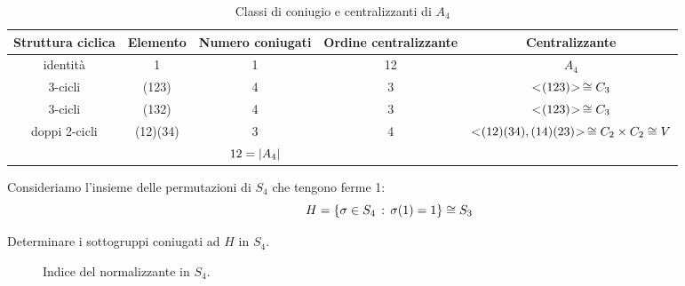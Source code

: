 \begin{sidewaystable}
	\centering
	\begin{tabular}{ccccc}
		\toprule
		Struttura ciclica & Elemento & Numero coniugati & Ordine centralizzante & Centralizzante \\
		\midrule
		identità & 1 & 1 & 12 & $A_4$ \\
		3-cicli & (123) & 4 & 3 & $< \negmedspace (123) \negmedspace > \,\cong C_3$ \\
		3-cicli & (132) & 4 & 3 & $< \negmedspace (123) \negmedspace > \,\cong C_3$ \\
		doppi 2-cicli & (12)(34) & 3 & 4 & $< \negmedspace (12)(34),(14)(23) \negmedspace > \,\cong C_2 \times C_2 \cong V$ \\
		\midrule
		& & $12 = \lvert A_4 \rvert$ & & \\
		\bottomrule
	\end{tabular}
	\caption{Classi di coniugio e centralizzanti di $A_4$}
	\label{fig:classi_coniugio_a4}
\end{sidewaystable}

\begin{esercizio}
	Consideriamo l'insieme delle permutazioni di $S_4$ che tengono ferme 1:
	\begin{equation*}
		H = \{\sigma \in S_4 \,:\, \sigma(1) = 1\} \cong S_3
	\end{equation*}

	Determinare i sottogruppi coniugati ad $H$ in $S_4$.
\end{esercizio}

\begin{figure}[tp]
	\centering
	\caption{Indice del normalizzante in $S_4$.}
	\label{fig:normalizzante_di_H_in_S4}
\end{figure}

